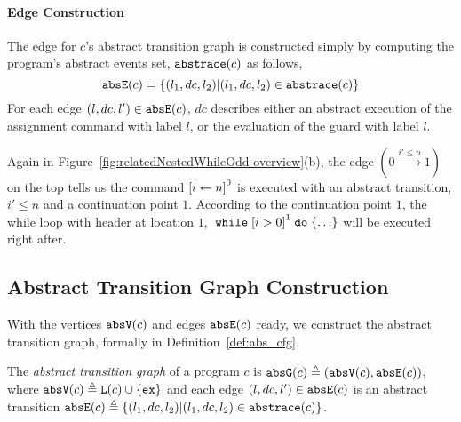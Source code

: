 \paragraph{Edge Construction}
The edge for $c$'s abstract transition graph is constructed simply by computing the program's abstract events set, $\mathtt{abs}{\mathtt{trace}}(c)$ as follows,
 \[
 \mathtt{abs}{\mathtt{E}}(c) = \{(l_1, dc, l_2) | (l_1, dc, l_2) \in \mathtt{abs}{\mathtt{trace}}(c)\}
 \]
For each edge $(l, dc, l') \in \mathtt{abs}{\mathtt{E}}(c)$, $dc$ describes either an abstract execution of the assignment command with label $l$,
or the evaluation of the guard with label $l$.
%

Again in Figure~\ref{fig:relatedNestedWhileOdd-overview}(b),
the edge $(0 \xrightarrow{i' \leq n} 1)$ on the top tells us the command 
$\clabel{\assign{i}{n}}^0$ is executed with an abstract transition, $i' \leq n$ and a continuation point $1$. 
According to the continuation point $1$, the while loop with header at location $1$, $\ewhile \clabel{i > 0}^1 \edo \{\ldots\}$ will be executed right after.

\subsection{Abstract Transition Graph Construction} 
With the vertices $\mathtt{abs}{\mathtt{V}}(c)$ and edges $\mathtt{abs}{\mathtt{E}}(c)$ ready, we construct the abstract transition graph, formally in
Definition~\ref{def:abs_cfg}.
%
\begin{defn}
 \label{def:abs_cfg}
 The \emph{abstract transition graph} of a program $c$ is $\mathtt{abs}{\mathtt{G}}(c) \triangleq (\mathtt{abs}{\mathtt{V}}(c), \mathtt{abs}{\mathtt{E}}(c))$, where
 $\mathtt{abs}{\mathtt{V}}(c) \triangleq \mathtt{L}(c)\cup\{\mathtt{ex}\}$
 and each edge $(l, dc, l') \in \mathtt{abs}{\mathtt{E}}(c)$ is an abstract transition
 $\mathtt{abs}{\mathtt{E}}(c) \triangleq \{(l_1, dc, l_2) | (l_1, dc, l_2) \in \mathtt{abs}{\mathtt{trace}}(c)\}$.
\end{defn}

